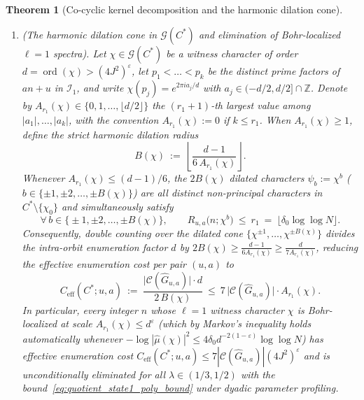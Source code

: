 \documentclass[11pt, a4paper]{article}
\theoremstyle{plain}
\newtheorem{theorem}{Theorem}[section]
\theoremstyle{definition}
\newcommand{\Z}{\mathbb{Z}}
\begin{document}
\begin{theorem}[Co-cyclic kernel decomposition and the harmonic dilation cone]
\begin{enumerate}[label=(\alph*)]
    \item \emph{(The harmonic dilation cone in $\mathcal{G}(C^{\ast})$ and elimination of Bohr-localized $\ell=1$ spectra).} 
    Let $\chi\in\mathcal{G}(C^{\ast})$ be a witness character of order $d=\operatorname{ord}(\chi)>(4J^{2})^{\varepsilon}$, let $p_1<\dots<p_k$ be the distinct prime factors of $an+u$ in $\mathcal{I}_1$, and write $\chi(p_j)=e^{2\pi i a_j/d}$ with $a_j\in(-d/2,d/2]\cap\Z$. Denote by $A_{r_1}(\chi)\in\{0,1,\dots,\lfloor d/2\rfloor\}$ the $(r_1+1)$-th largest value among $|a_1|,\dots,|a_k|$, with the convention $A_{r_1}(\chi):=0$ if $k\le r_1$. When $A_{r_1}(\chi)\ge 1$, define the \emph{strict harmonic dilation radius}
    \begin{equation}\label{eq:harmonic_dilation_radius}
    B(\chi)\ :=\ \left\lfloor\frac{d-1}{6\,A_{r_1}(\chi)}\right\rfloor.
    \end{equation}
    Whenever $A_{r_1}(\chi)\le (d-1)/6$, the $2B(\chi)$ dilated characters $\psi_b:=\chi^{b}$ ($b\in\{\pm1,\pm2,$\linebreak $\dots,\pm B(\chi)\}$) are \emph{all distinct non-principal characters} in $C^{\ast}\setminus\{\chi_0\}$ and \emph{simultaneously} satisfy
    \begin{equation}\label{eq:harmonic_cone_collision_bound}
    \forall\,b\in\big\{\pm1,\pm2,\dots,\pm B(\chi)\big\},\qquad R_{u,a}\big(n;\chi^{b}\big)\ \le\ r_1\ =\ \lfloor\delta_0\log\log N\rfloor.
    \end{equation}
    Consequently, double counting over the dilated cone $\{\chi^{\pm 1},\dots,\chi^{\pm B(\chi)}\}$ divides the intra-orbit enumeration factor $d$ by $2B(\chi)\ge\frac{d-1}{6A_{r_1}(\chi)}\ge\frac{d}{7A_{r_1}(\chi)}$, reducing the effective enumeration cost per pair $(u,a)$ to
    \begin{equation}\label{eq:harmonic_cone_effective_cost}
    C_{\mathrm{eff}}(C^{\ast};u,a)\ :=\ \frac{\big|\mathcal{C}(\widehat{G}_{u,a})\big|\cdot d}{2\,B(\chi)}\ \le\ 7\,\big|\mathcal{C}(\widehat{G}_{u,a})\big|\cdot A_{r_1}(\chi).
    \end{equation}
    In particular, every integer $n$ whose $\ell=1$ witness character $\chi$ is \emph{Bohr-localized} at scale $A_{r_1}(\chi)\le d^{\varepsilon}$ (which by Markov's inequality holds automatically whenever $-\log|\widehat{\mu}(\chi)|^{2}\le 4\delta_0 d^{-2(1-\varepsilon)}\log\log N$) has effective enumeration cost $C_{\mathrm{eff}}(C^{\ast};u,a)\le 7|\mathcal{C}(\widehat{G}_{u,a})|(4J^{2})^{\varepsilon}$ and is unconditionally eliminated for all $\lambda\in(1/3,1/2)$ with the bound~\eqref{eq:quotient_state1_poly_bound} under dyadic parameter profiling.
\end{enumerate}
\end{theorem}
\end{document}
